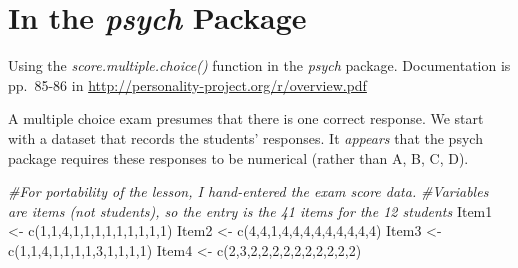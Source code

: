 \documentclass[
  english,
]{book}
\newenvironment{Shaded}{\begin{snugshade}}{\end{snugshade}}
\newcommand{\CommentTok}[1]{\textcolor[rgb]{0.56,0.35,0.01}{\textit{#1}}}
\newcommand{\DecValTok}[1]{\textcolor[rgb]{0.00,0.00,0.81}{#1}}
\newcommand{\FunctionTok}[1]{\textcolor[rgb]{0.00,0.00,0.00}{#1}}
\newcommand{\NormalTok}[1]{#1}
\newcommand{\OtherTok}[1]{\textcolor[rgb]{0.56,0.35,0.01}{#1}}
\begin{document}
\hypertarget{in-the-psych-package}{%
\section{\texorpdfstring{In the \emph{psych} Package}{In the psych Package}}\label{in-the-psych-package}}

Using the \emph{score.multiple.choice()} function in the \emph{psych} package. Documentation is pp.~85-86 in \url{http://personality-project.org/r/overview.pdf}

A multiple choice exam presumes that there is one correct response. We start with a dataset that records the students' responses. It \emph{appears} that the psych package requires these responses to be numerical (rather than A, B, C, D).

\begin{Shaded}
\begin{Highlighting}[]
\CommentTok{\#For portability of the lesson, I hand{-}entered the exam score data. }
\CommentTok{\#Variables are items (not students), so the entry is the 41 items for the 12 students}
\NormalTok{Item1 }\OtherTok{\textless{}{-}} \FunctionTok{c}\NormalTok{(}\DecValTok{1}\NormalTok{,}\DecValTok{1}\NormalTok{,}\DecValTok{4}\NormalTok{,}\DecValTok{1}\NormalTok{,}\DecValTok{1}\NormalTok{,}\DecValTok{1}\NormalTok{,}\DecValTok{1}\NormalTok{,}\DecValTok{1}\NormalTok{,}\DecValTok{1}\NormalTok{,}\DecValTok{1}\NormalTok{,}\DecValTok{1}\NormalTok{,}\DecValTok{1}\NormalTok{)}
\NormalTok{Item2 }\OtherTok{\textless{}{-}} \FunctionTok{c}\NormalTok{(}\DecValTok{4}\NormalTok{,}\DecValTok{4}\NormalTok{,}\DecValTok{1}\NormalTok{,}\DecValTok{4}\NormalTok{,}\DecValTok{4}\NormalTok{,}\DecValTok{4}\NormalTok{,}\DecValTok{4}\NormalTok{,}\DecValTok{4}\NormalTok{,}\DecValTok{4}\NormalTok{,}\DecValTok{4}\NormalTok{,}\DecValTok{4}\NormalTok{,}\DecValTok{4}\NormalTok{)}
\NormalTok{Item3 }\OtherTok{\textless{}{-}} \FunctionTok{c}\NormalTok{(}\DecValTok{1}\NormalTok{,}\DecValTok{1}\NormalTok{,}\DecValTok{4}\NormalTok{,}\DecValTok{1}\NormalTok{,}\DecValTok{1}\NormalTok{,}\DecValTok{1}\NormalTok{,}\DecValTok{1}\NormalTok{,}\DecValTok{3}\NormalTok{,}\DecValTok{1}\NormalTok{,}\DecValTok{1}\NormalTok{,}\DecValTok{1}\NormalTok{,}\DecValTok{1}\NormalTok{)}
\NormalTok{Item4 }\OtherTok{\textless{}{-}} \FunctionTok{c}\NormalTok{(}\DecValTok{2}\NormalTok{,}\DecValTok{3}\NormalTok{,}\DecValTok{2}\NormalTok{,}\DecValTok{2}\NormalTok{,}\DecValTok{2}\NormalTok{,}\DecValTok{2}\NormalTok{,}\DecValTok{2}\NormalTok{,}\DecValTok{2}\NormalTok{,}\DecValTok{2}\NormalTok{,}\DecValTok{2}\NormalTok{,}\DecValTok{2}\NormalTok{,}\DecValTok{2}\NormalTok{)}

\end{Highlighting}
\end{Shaded}
\end{document}
